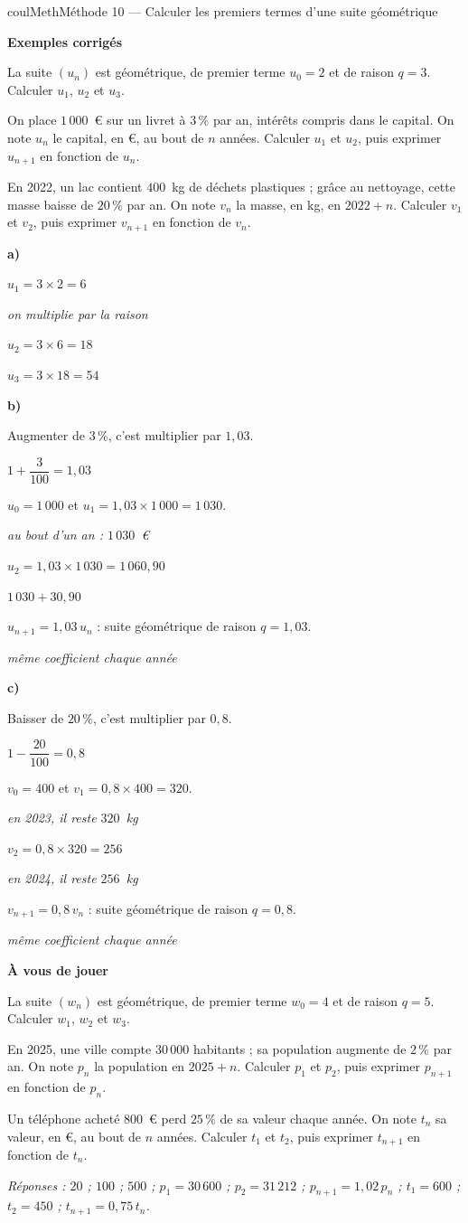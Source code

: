 \documentclass[11pt,a4paper]{article}
\makeatletter
\newcounter{lycee@signet}
\newcommand{\signet}[3][]{\stepcounter{lycee@signet}%
  \edef\lycee@dest{\if\relax\detokenize{#1}\relax
    signet.\arabic{lycee@signet}\else#1\fi}%
  \hypertarget{\lycee@dest}{}\bookmark[level=#2,dest=\lycee@dest]{#3}}
\newcommand{\res}[1]{#1}
\newcounter{methode}
\newenvironment{methodebox}[1][Méthode]{\stepcounter{methode}%
  \begin{boitecours}[phantom={\signet[methode-\arabic{methode}]{2}{#1}}]{coulMeth}{#1}}%
  {\end{boitecours}}
\newcommand{\etape}[1]{\par\smallskip\textbf{\color{coulMeth}#1}\par\nobreak\smallskip}
\newcommand{\reponse}[1]{\par\smallskip
  {\footnotesize\itshape\color{black!55}Réponses : #1}}
\newcommand{\explique}[2]{\par\smallskip\noindent
  \begin{minipage}[t]{0.57\linewidth}\raggedright #1\end{minipage}\hfill
  \begin{minipage}[t]{0.40\linewidth}\raggedright\leavevmode
    {\small\itshape\color{black!60}#2}\end{minipage}\par}
\newcommand{\cas}[1]{\par\smallskip\noindent\textbf{\color{coulExo}#1}\vadjust{\nobreak}}
\newenvironment{correction}{\par}{\par}
\newcommand{\etapeexemples}{\etape{Exemples corrigés}}
\makeatother
\begin{document}
\begin{methodebox}[Méthode 10 --- Calculer les premiers termes d'une suite géométrique]
\etapeexemples
\begin{questions}[label=\alph*)]
  \item La suite $(u_{n})$ est géométrique, de premier terme $u_{0}=2$ et de raison
        $q=3$. Calculer $u_{1}$, $u_{2}$ et $u_{3}$.
  \item On place $1\,000$~€ sur un livret à $3\,\%$ par an, intérêts compris dans le
        capital. On note $u_{n}$ le capital, en €, au bout de $n$ années. Calculer
        $u_{1}$ et $u_{2}$, puis exprimer $u_{n+1}$ en fonction de $u_{n}$.
  \item En 2022, un lac contient $400$~kg de déchets plastiques ; grâce au nettoyage,
        cette masse baisse de $20\,\%$ par an. On note $v_{n}$ la masse, en kg, en
        $2022+n$. Calculer $v_{1}$ et $v_{2}$, puis exprimer $v_{n+1}$ en fonction de
        $v_{n}$.
\end{questions}
\begin{correction}
\cas{a)}
\explique{$u_{1}=3\times 2=\res{6}$}{on multiplie par la raison}
\explique{$u_{2}=3\times 6=\res{18}$}{}
\explique{$u_{3}=3\times 18=\res{54}$}{}
\cas{b)}
\explique{Augmenter de $3\,\%$, c'est multiplier par $1{,}03$.}{$1+\dfrac{3}{100}=1{,}03$}
\explique{$u_{0}=1\,000$ et $u_{1}=1{,}03\times 1\,000=\res{1\,030}$.}{au bout d'un an :
$1\,030$~€}
\explique{$u_{2}=1{,}03\times 1\,030=\res{1\,060{,}90}$}{$1\,030+30{,}90$}
\explique{$u_{n+1}=\res{1{,}03\,u_{n}}$ : suite géométrique de raison $q=1{,}03$.}{même
coefficient chaque année}
\cas{c)}
\explique{Baisser de $20\,\%$, c'est multiplier par $0{,}8$.}{$1-\dfrac{20}{100}=0{,}8$}
\explique{$v_{0}=400$ et $v_{1}=0{,}8\times 400=\res{320}$.}{en 2023, il reste $320$~kg}
\explique{$v_{2}=0{,}8\times 320=\res{256}$}{en 2024, il reste $256$~kg}
\explique{$v_{n+1}=\res{0{,}8\,v_{n}}$ : suite géométrique de raison $q=0{,}8$.}{même
coefficient chaque année}
\end{correction}

\etape{À vous de jouer}
\begin{questions}
  \item La suite $(w_{n})$ est géométrique, de premier terme $w_{0}=4$ et de raison
        $q=5$. Calculer $w_{1}$, $w_{2}$ et $w_{3}$.
  \item En 2025, une ville compte $30\,000$ habitants ; sa population augmente de
        $2\,\%$ par an. On note $p_{n}$ la population en $2025+n$. Calculer $p_{1}$ et
        $p_{2}$, puis exprimer $p_{n+1}$ en fonction de $p_{n}$.
  \item Un téléphone acheté $800$~€ perd $25\,\%$ de sa valeur chaque année. On note
        $t_{n}$ sa valeur, en €, au bout de $n$ années. Calculer $t_{1}$ et $t_{2}$,
        puis exprimer $t_{n+1}$ en fonction de $t_{n}$.
\end{questions}
\reponse{$20$ ; $100$ ; $500$ ;\; $p_{1}=30\,600$ ; $p_{2}=31\,212$ ;
$p_{n+1}=1{,}02\,p_{n}$ ;\; $t_{1}=600$ ; $t_{2}=450$ ; $t_{n+1}=0{,}75\,t_{n}$.}
\end{methodebox}
\end{document}
